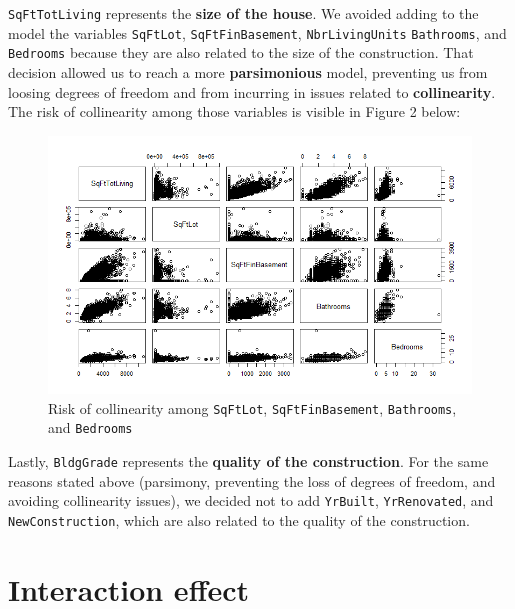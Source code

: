 \documentclass[12pt,a4paper]{article}
\begin{document}
		 
	
	\noindent \texttt{SqFtTotLiving} represents the \textbf{size of the house}. We avoided adding to the model the variables \texttt{SqFtLot}, \texttt{SqFtFinBasement}, \texttt{NbrLivingUnits} \texttt{Bathrooms}, and \texttt{Bedrooms} because they are also related to the size of the construction. That decision allowed us to reach a more \textbf{parsimonious} model, preventing us from loosing degrees of freedom and from incurring in issues related to \textbf{collinearity}. The risk of collinearity among those variables is visible in Figure 2 below: \\
	
		 
	
	\begin{figure}[H]
		\centering
		\includegraphics[width=1\linewidth]{SqFtTotLiving_pairs}
		\caption{Risk of collinearity among \texttt{SqFtLot}, \texttt{SqFtFinBasement}, \texttt{Bathrooms}, and \texttt{Bedrooms}}
		\label{fig:sqfttotlivingpairs}
	\end{figure}
		
	\noindent Lastly, \texttt{BldgGrade} represents the \textbf{quality of the construction}. For the same reasons stated above (parsimony, preventing the loss of degrees of freedom, and avoiding collinearity issues), we decided not to add \texttt{YrBuilt}, \texttt{YrRenovated}, and \texttt{NewConstruction}, which are also related to the quality of the construction. \\
	
\vspace{.5cm}

\section{Interaction effect}
\end{document}
